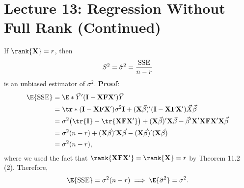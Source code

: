 \section{Lecture 13: Regression Without Full Rank (Continued)}
\begin{Theorem}{}{}
    If $ \rank{\Matrix{X}}=r $, then
    \[ S^2=\hat{\sigma}^2=\frac{\text{SSE}}{n-r} \]
    is an unbiased estimator of $\sigma^2$.
    \tcblower{}
    \textbf{Proof}:
    \begin{align*}
        \E{\SSE}
         & =\E*{\Vector{Y}'(\Matrix{I}-\Matrix{X}\Matrix{F}\Matrix{X}')\Vector{Y}}                                                                                                                                         \\
         & =\tr*{(\Matrix{I}-\Matrix{X}\Matrix{F}\Matrix{X}')\sigma^2 \Matrix{I}}+(\Matrix{X}\Vector{\beta})'(\Matrix{I}-\Matrix{X}\Matrix{F}\Matrix{X}')\Vector{X}\Vector{\beta}                                          \\
         & =\sigma^2\bigl(\tr{\Matrix{I}}-\tr{\Matrix{X}\Matrix{F}\Matrix{X}'}\bigr)+(\Matrix{X}\Vector{\beta})'\Matrix{X}\Vector{\beta}-\Vector{\beta}'\Matrix{X}'\Matrix{X}\Matrix{F}\Matrix{X}'\Matrix{X}\Vector{\beta} \\
         & =\sigma^2(n-r)+(\Matrix{X}\Vector{\beta})'\Matrix{X}\Vector{\beta}-(\Matrix{X}\Vector{\beta})'(\Matrix{X}\Vector{\beta})                                                                                        \\
         & =\sigma^2(n-r),
    \end{align*}
    where we used the fact that $ \rank{\Matrix{X}\Matrix{F}\Matrix{X}'}=\rank{\Matrix{X}}=r $ by Theorem 11.2 (2).
    Therefore,
    \[ \E{\SSE}=\sigma^2(n-r)\implies \E{\hat{\sigma}^2}=\sigma^2. \]
\end{Theorem}
